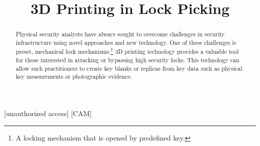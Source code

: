 \documentclass{acm_proc_article-sp}
\title{3D Printing in Lock Picking}
\begin{document}
\maketitle

\begin{abstract}
    Physical security analysts have always sought to overcome challenges in security infrastructure using novel approaches and new technology. One of these challenges is preset, mechanical lock mechanisms.\footnote{A locking mechanism that is opened by predefined key.}
    3D printing technology provides a valuable tool for those interested in attacking or bypassing high security locks. This technology can allow such practitioners to create key blanks or replicas from key data such as physical key measurements or photographic evidence.
\end{abstract}

[unauthorized access] 
[CAM]


\end{document}
